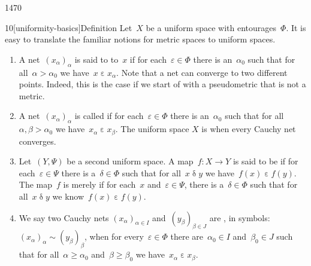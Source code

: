 \begin{parsec}{1470}%
\begin{point}{10}[uniformity-basics]{Definition}%
Let~$X$ be a uniform space with entourages~$\Phi$.
It is easy to translate the familiar notions for
    metric spaces to uniform spaces.
\begin{enumerate}
    \item A net~$(x_\alpha)_\alpha$ is said to
         to~$x$
            if for each~$\varepsilon \in \Phi$
            there is an~$\alpha_0$
            such that for all~$\alpha > \alpha_0$
                we have~$x \mathrel\varepsilon x_\alpha$.
Note that a net can converge to two different points.
Indeed, this is the case if we start of with a pseudometric
    that is not a metric.
\item A net~$(x_\alpha)_\alpha$ is called 
        if for each~$\varepsilon \in \Phi$
            there is an~$\alpha_0$
            such that for all~$\alpha,\beta > \alpha_0$
            we have~$x_\alpha \mathrel\varepsilon x_\beta$.
            The uniform space $X$ is 
    when every Cauchy net converges.
\item
Let~$(Y,\Psi)$ be a second uniform space.
A map~$f\colon X \to Y$
is said to be 
if for each~$\varepsilon \in \Psi$
there is a~$\delta \in \Phi$
such that for all~$x \mathrel\delta y$
we have~$f(x) \mathrel\varepsilon f(y)$.
The map~$f$ is merely 
if for each~$x$ and~$\varepsilon\in\Psi$,
there is a~$\delta \in \Phi$
such that for all~$x \mathrel{\delta} y$
we know~$f(x) \mathrel\varepsilon f(y)$.
\item
We say two Cauchy nets
$(x_\alpha)_{\alpha\in I}$
and~$(y_\beta)_{\beta\in J}$ are ,
in symbols: $(x_\alpha)_\alpha \sim (y_\beta)_\beta$,
when for every~$\varepsilon \in \Phi$
there are~$\alpha_0 \in I$ and~$\beta_0 \in J$
such that for all~$\alpha \geq \alpha_0$ and~$\beta \geq \beta_0$
we have~$x_\alpha \mathrel\varepsilon x_\beta$.


\end{enumerate}
\end{point}
\end{parsec}
